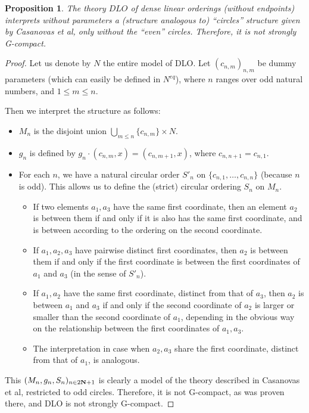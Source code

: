 \documentclass[final,a4paper,12pt]{amsart}
\newtheorem{prop}[thm]{Proposition}
\theoremstyle{remark}
\theoremstyle{definition}
\newcommand{\N}{{\bf N}}
\begin{document}
	\begin{prop}
		The theory $DLO$ of dense linear orderings (without endpoints) interprets without parameters a (structure analogous to) ``circles'' structure given by Casanovas et al, only without the ``even'' circles. Therefore, it is not strongly G-compact.
	\end{prop}
	\begin{proof}
		Let us denote by $N$ the entire model of DLO. Let $(c_{n,m})_{n,m}$ be dummy parameters (which can easily be defined in $N^{eq}$), where $n$ ranges over odd natural numbers, and $1\leq m\leq n$.
		
		Then we interpret the structure as follows:
		\begin{itemize}
			\item
			$M_n$ is the disjoint union $\bigcup_{m\leq n} \{c_{n,m}\}\times N$.
			\item
			$g_n$ is defined by $g_n\cdot (c_{n,m},x)=(c_{n,m+1},x)$, where $c_{n,n+1}=c_{n,1}$.
			\item
			For each $n$, we have a natural circular order $S'_n$ on $\{c_{n,1},\ldots,c_{n,n}\}$ (because $n$ is odd). This allows us to define the (strict) circular ordering $S_n$ on $M_n$.
			\begin{itemize}
				\item
				If two elements $a_1,a_3$ have the same first coordinate, then an element $a_2$ is between them if and only if it is also has the same first coordinate, and is between according to the ordering on the second coordinate. 
				\item
				If $a_1, a_2, a_3$ have pairwise distinct first coordinates, then $a_2$ is between them if and only if the first coordinate is between the first coordinates of $a_1$ and $a_3$ (in the sense of $S'_n$).
				\item
				If $a_1, a_2$ have the same first coordinate, distinct from that of $a_3$, then $a_2$ is between $a_1$ and $a_3$ if and only if the second coordinate of $a_2$ is larger or smaller than the second coordinate of $a_1$, depending in the obvious way on the relationship between the first coordinates of $a_1,a_3$.
				\item
				The interpretation in case when $a_2,a_3$ share the first coordinate, distinct from that of $a_1$, is analogous.
			\end{itemize}
		\end{itemize}
		This $(M_n,g_n,S_n)_{n\in 2{\N}+1}$ is clearly a model of the theory described in Casanovas et al, restricted to odd circles. Therefore, it is not G-compact, as was proven there, and DLO is not strongly G-compact.
	\end{proof}
	
\end{document}
